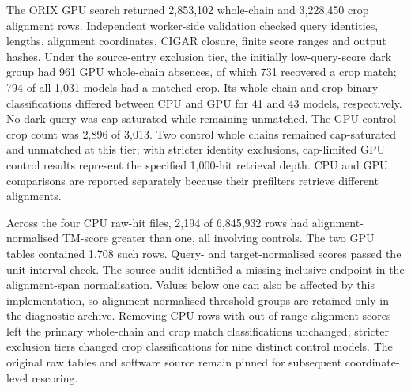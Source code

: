 \documentclass[11pt]{article}
\begin{document}
The ORIX GPU search returned 2{,}853{,}102 whole-chain and 3{,}228{,}450 crop alignment rows.
Independent worker-side validation checked query identities, lengths, alignment coordinates,
CIGAR closure, finite score ranges and output hashes. Under the source-entry exclusion tier,
the initially low-query-score dark group had 961 GPU whole-chain absences, of which 731
recovered a crop match; 794 of all 1{,}031 models had a matched crop. Its whole-chain and crop
binary classifications differed between CPU and GPU for 41 and 43 models, respectively.
No dark query was cap-saturated while remaining unmatched. The GPU control crop count was
2{,}896 of 3{,}013. Two control whole chains remained cap-saturated and unmatched at this tier;
with stricter identity exclusions, cap-limited GPU control results represent the specified
1{,}000-hit retrieval depth. CPU and GPU comparisons are reported separately because their
prefilters retrieve different alignments.

Across the four CPU raw-hit files, 2{,}194 of 6{,}845{,}932 rows had alignment-normalised
TM-score greater than one, all involving controls. The two GPU tables contained 1{,}708 such
rows. Query- and target-normalised scores passed the unit-interval check. The source audit
identified a missing inclusive endpoint in the alignment-span normalisation. Values below one
can also be affected by this implementation, so alignment-normalised threshold groups are
retained only in the diagnostic archive. Removing CPU rows with out-of-range alignment scores
left the primary whole-chain and crop match classifications unchanged; stricter exclusion tiers
changed crop classifications for nine distinct control models. The original raw tables and
software source remain pinned for subsequent coordinate-level rescoring.
\end{document}

